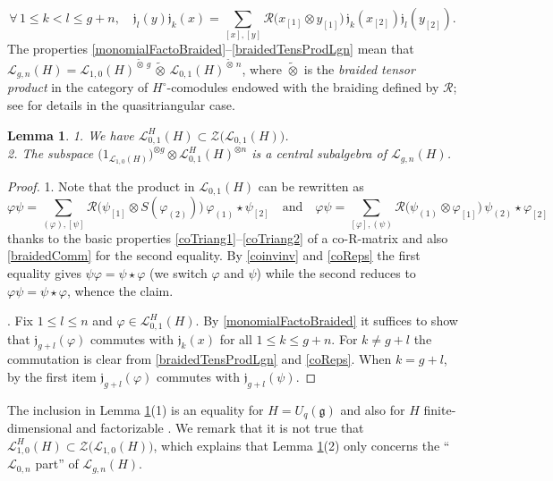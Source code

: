 \documentclass[11pt]{amsart}
\newtheorem{lem}[teo]{Lemma}
\begin{document}
\begin{equation}\label{braidedTensProdLgn}
\forall \,1 \leq k < l \leq g+n, \quad \mathfrak{j}_l(y) \mathfrak{j}_k(x) = \sum_{[x],[y]}\mathcal{R}\bigl( x_{[1]} \otimes y_{[1]} \bigr) \, \mathfrak{j}_k(x_{[2]}) \mathfrak{j}_l(y_{[2]}).
\end{equation}
The properties \eqref{monomialFactoBraided}--\eqref{braidedTensProdLgn} mean that $\mathcal{L}_{g,n}(H) = \mathcal{L}_{1,0}(H)^{\widetilde{\otimes}\,g} \,\widetilde{\otimes}\, \mathcal{L}_{0,1}(H)^{\widetilde{\otimes}\,n}$, where $\widetilde{\otimes}$ is the {\em braided tensor product} in the category of $H^\circ$-comodules endowed with the braiding defined by $\mathcal{R}$; see \cite[\S 4.1]{BFR} for details in the quasitriangular case.

\begin{lem}\label{Z1general}
1. We have $\mathcal{L}_{0,1}^H(H) \subset \mathcal{Z}\bigl( \mathcal{L}_{0,1}(H) \bigr)$.
\\2. The subspace $\bigl( 1_{\mathcal{L}_{1,0}(H)} \bigr)^{\otimes g} \otimes \mathcal{L}_{0,1}^H(H)^{\otimes n}$ is a central subalgebra of $\mathcal{L}_{g,n}(H)$.
\end{lem}
\begin{proof}
1. Note that the product in $\mathcal{L}_{0,1}(H)$ can be rewritten as
\begin{equation}\label{productL01InTermsOfCoaction}
\varphi\psi = \sum_{(\varphi),[\psi]} \mathcal{R}\bigl( \psi_{[1]} \otimes S(\varphi_{(2)}) \bigr) \,\varphi_{(1)} \star \psi_{[2]} \quad\text{and}\quad \varphi\psi = \sum_{[\varphi],(\psi)} \mathcal{R}\bigl( \psi_{(1)} \otimes \varphi_{[1]} \bigr) \, \psi_{(2)} \star \varphi_{[2]}
\end{equation}
thanks to the basic properties \eqref{coTriang1}--\eqref{coTriang2} of a co-R-matrix and also \eqref{braidedComm} for the second equality. By \eqref{coinvinv} and \eqref{coReps} the first equality gives $\psi\varphi = \psi \star \varphi$ (we switch $\varphi$ and $\psi$) while the second reduces to $\varphi\psi = \psi \star \varphi$, whence the claim.

. Fix $1 \leq l \leq n$ and $\varphi \in \mathcal{L}_{0,1}^H(H)$. By \eqref{monomialFactoBraided} it suffices to show that $\mathfrak{j}_{g+l}(\varphi)$ commutes with $\mathfrak{j}_k(x)$ for all $1 \leq k \leq g+n$. For $k\ne g+l$ the commutation is clear from \eqref{braidedTensProdLgn} and \eqref{coReps}. When $k=g+l$, by the first item $\mathfrak{j}_{g+l}(\varphi)$ commutes with $\mathfrak{j}_{g+l}(\psi)$. 
\end{proof}
\noindent The inclusion in Lemma \ref{Z1general}(1) is an equality for $H = U_q(\mathfrak{g})$ \cite[Prop.\,6.19]{BR1} and also for $H$ finite-dimensional and factorizable \cite[Th.\,3.7]{FaitgSL2Z}. We remark that it is not true that $\mathcal{L}_{1,0}^H(H) \subset \mathcal{Z}\bigl( \mathcal{L}_{1,0}(H) \bigr)$, which explains that Lemma \ref{Z1general}(2) only concerns the ``$\mathcal{L}_{0,n}$ part'' of $\mathcal{L}_{g,n}(H)$.
\end{document}

